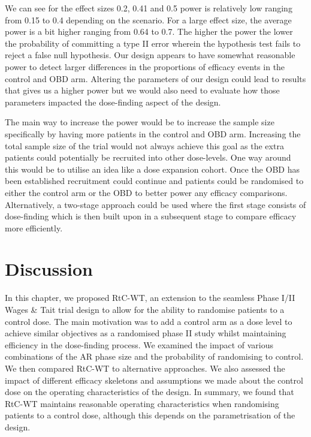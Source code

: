 We can see for the effect sizes 0.2, 0.41 and 0.5 power is relatively low ranging from 0.15 to 0.4 depending on the scenario. For a large effect size, the average power is a bit higher ranging from 0.64 to 0.7. The higher the power the lower the probability of committing a type \RN{2} error wherein the hypothesis test fails to reject a false null hypothesis. Our design appears to have somewhat reasonable power to detect larger differences in the proportions of efficacy events in the control and OBD arm. Altering the parameters of our design could lead to results that gives us a higher power but we would also need to evaluate how those parameters impacted the dose-finding aspect of the design.   

The main way to increase the power would be to increase the sample size specifically by having more patients in the control and OBD arm. Increasing the total sample size of the trial would not always achieve this goal as the extra patients could potentially be recruited into other dose-levels. One way around this would be to utilise an idea like a dose expansion cohort. Once the OBD has been established recruitment could continue and patients could be randomised to either the control arm or the OBD to better power any efficacy comparisons. Alternatively, a two-stage approach could be used where the first stage consists of dose-finding which is then built upon in a subsequent stage to compare efficacy more efficiently. 

\section{Discussion}
\label{WT:Discussion}

In this chapter, we proposed RtC-WT, an extension to the seamless Phase \RN{1}/\RN{2} Wages \& Tait trial design to allow for the ability to randomise patients to a control dose. The main motivation was to add a control arm as a dose level to achieve similar objectives as a randomised phase \RN{2} study whilst maintaining efficiency in the dose-finding process. We examined the impact of various combinations of the AR phase size and the probability of randomising to control. We then compared RtC-WT to alternative approaches. We also assessed the impact of different efficacy skeletons and assumptions we made about the control dose on the operating characteristics of the design. In summary, we found that RtC-WT maintains reasonable operating characteristics when randomising patients to a control dose, although this depends on the parametrisation of the design.   


